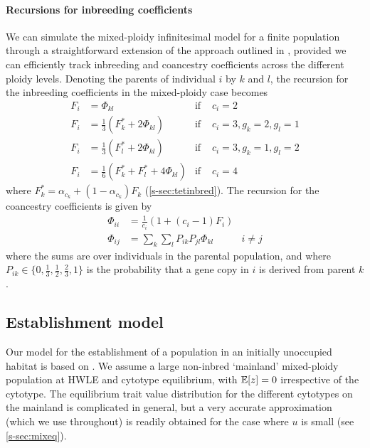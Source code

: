 \documentclass[12pt,a4paper]{article}
\begin{document}
\paragraph{Recursions for inbreeding coefficients}

We can simulate the mixed-ploidy infinitesimal model for a finite population
through a straightforward extension of the approach outlined in
\cite{barton2017}, provided we can efficiently track inbreeding and coancestry
coefficients across the different ploidy levels.
Denoting the parents of individual $i$ by $k$ and $l$, the recursion for the
inbreeding coefficients in the mixed-ploidy case becomes
\begin{align}
    F_i &= \Phi_{kl} & \text{if } & c_i = 2 \nonumber \\ 
    F_i &= \frac{1}{3}\left(F_k^\ast + 2\Phi_{kl}\right) & \text{if } 
        & c_i = 3, g_k = 2, g_l = 1 \nonumber \\ 
    F_i &= \frac{1}{3}\left(F_l^\ast + 2\Phi_{kl}\right) & \text{if } 
        & c_i = 3, g_k = 1, g_l = 2 \nonumber \\ 
    F_i &= \frac1 6 (F_k^\ast + F_l^\ast + 4\Phi_{kl}) & \text{if } & c_i = 4
\end{align}
where $F_k^\ast = \alpha_{c_k} + (1-\alpha_{c_k})F_k$ (\cref{s-sec:tetinbred}).
The recursion for the coancestry coefficients is given by
\begin{align}
    \Phi_{ii} &= \frac{1}{c_{i}} \left(1 + (c_i-1)F_i\right) \nonumber \\
    \Phi_{ij} &= \sum_k \sum_l P_{ik}P_{jl} \Phi_{kl} & i \ne j 
    \label{eq:coancestry}
\end{align}
where the sums are over individuals in the parental population, and where
$P_{ik} \in \{0, \frac1 3, \frac1 2, \frac2 3, 1\}$ is the probability that a
gene copy in $i$ is derived from parent $k$.

\subsection*{Establishment model}

Our model for the establishment of a population in an initially unoccupied
habitat is based on \cite{barton2018}.
We assume a large non-inbred `mainland' mixed-ploidy population at HWLE and
cytotype equilibrium, with $\mathbb{E}[z] = 0$ irrespective of the cytotype.
The equilibrium trait value distribution for the different cytotypes on the
mainland is complicated in general, but a very accurate approximation (which we
use throughout) is readily obtained for the case where $u$ is small (see
\cref{s-sec:mixeq}).
\end{document}
